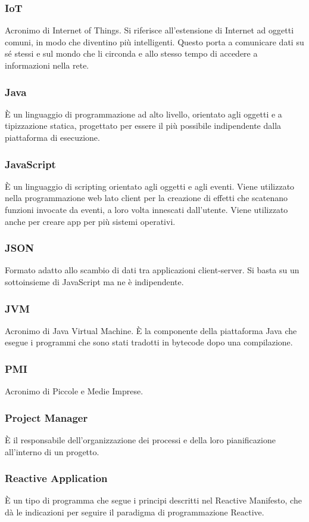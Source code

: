     \subsubsection{\label{IoT}IoT}
      Acronimo di Internet of Things. Si riferisce all'estensione di Internet ad oggetti comuni, in modo che diventino più intelligenti. Questo porta a comunicare dati su sé stessi e sul mondo che li circonda e allo stesso tempo di accedere a informazioni nella rete.
    \subsubsection{\label{Java}Java}
      È un linguaggio di programmazione ad alto livello, orientato agli oggetti e a tipizzazione statica, progettato per essere il più possibile indipendente dalla piattaforma di esecuzione.
    \subsubsection{\label{JS}JavaScript}
      È un linguaggio di scripting orientato agli oggetti e agli eventi. Viene utilizzato nella programmazione web lato client per la creazione di effetti che scatenano funzioni invocate da eventi, a loro volta innescati dall'utente. Viene utilizzato anche per creare app per più sistemi operativi.
    \subsubsection{\label{JSON}JSON}
      Formato adatto allo scambio di dati tra applicazioni client-server. Si basta su un sottoinsieme di JavaScript ma ne è indipendente.
    \subsubsection{\label{JVM}JVM}
      Acronimo di Java Virtual Machine. È la componente della piattaforma Java che esegue i programmi che sono stati tradotti in bytecode dopo una compilazione.
    \subsubsection{\label{PMI}PMI}
      Acronimo di Piccole e Medie Imprese.
    \subsubsection{\label{PM}Project Manager}
      È il responsabile dell'organizzazione dei processi e della loro pianificazione all'interno di un progetto.
    \subsubsection{\label{RA}Reactive Application}
      È un tipo di programma che segue i principi descritti nel Reactive Manifesto, che dà le indicazioni per seguire il paradigma di programmazione Reactive.
